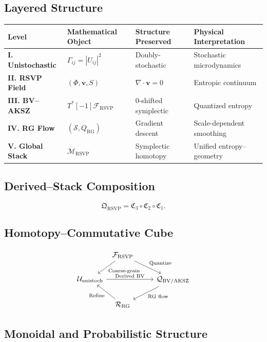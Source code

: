 \documentclass[12pt]{article}
\begin{document}
\subsection{Layered Structure}

\begin{center}
\begin{tabular}{@{}llll@{}}
\toprule
\textbf{Level} & \textbf{Mathematical Object} & \textbf{Structure Preserved} & \textbf{Physical Interpretation} \\
\midrule
\textbf{I. Unistochastic} & \(\Gamma_{ij} = |U_{ij}|^2\) & Doubly-stochastic & Stochastic microdynamics \\
\textbf{II. RSVP Field} & \((\Phi, \mathbf{v}, S)\) & \(\nabla \cdot \mathbf{v} = 0\) & Entropic continuum \\
\textbf{III. BV–AKSZ} & \(T^*[-1] \mathcal{F}_{\mathrm{RSVP}}\) & 0-shifted symplectic & Quantized entropy \\
\textbf{IV. RG Flow} & \((\mathcal{S}, Q_{\mathrm{RG}})\) & Gradient descent & Scale-dependent smoothing \\
\textbf{V. Global Stack} & \(\mathcal{M}_{\mathrm{RSVP}}\) & Symplectic homotopy & Unified entropy–geometry \\
\bottomrule
\end{tabular}
\end{center}

\subsection{Derived–Stack Composition}

\[
\mathfrak{Q}_{\mathrm{RSVP}} = \mathfrak{C}_3 \circ \mathfrak{C}_2 \circ \mathfrak{C}_1.
\]

\subsection{Homotopy–Commutative Cube}

\[
\begin{tikzcd}
 &[-2em] \mathcal{F}_{\mathrm{RSVP}} \arrow[dr,"\text{Quantize}"] \arrow[dl,"\text{Coarse-grain}"] & \\
\mathcal{U}_{\mathrm{unistoch}} \arrow[rr,"\text{Derived BV}"] & & \mathcal{Q}_{\mathrm{BV/AKSZ}} \arrow[dl,"\text{RG flow}"] \\
 & \mathcal{R}_{\mathrm{RG}} \arrow[ul,"\text{Refine}"] &
\end{tikzcd}
\]

\subsection{Monoidal and Probabilistic Structure}
\end{document}
